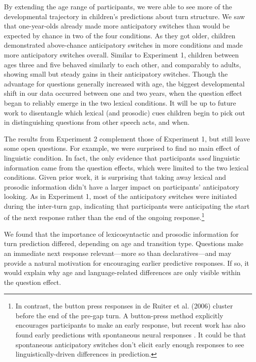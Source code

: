 \documentclass[authoryear, 12pt]{elsarticle}
\begin{document}
By extending the age range of participants, we were able to see more of the developmental trajectory in children's predictions about turn structure. We saw that one-year-olds already made more anticipatory switches than would be expected by chance in two of the four conditions. As they got older, children demonstrated above-chance anticipatory switches in more conditions and made more anticipatory switches overall. Similar to Experiment 1, children between ages three and five behaved similarly to each other, and comparably to adults, showing small but steady gains in their anticipatory switches. Though the advantage for questions generally increased with age, the biggest developmental shift in our data occurred between one and two years, when the question effect began to reliably emerge in the two lexical conditions. It will be up to future work to disentangle which lexical (and prosodic) cues children begin to pick out in distinguishing questions from other speech acts, and when.

The results from Experiment 2 complement those of Experiment 1, but still leave some open questions. For example, we were surprised to find no main effect of linguistic condition. In fact, the only evidence that participants \textit{used} linguistic information came from the question effects, which were limited to the two lexical conditions. Given prior work, it is surprising that taking away lexical and prosodic information didn't have a larger impact on participants' anticipatory looking. As in Experiment 1, most of the anticipatory switches were initiated during the inter-turn gap, indicating that participants were anticipating the start of the next response rather than the end of the ongoing response.\footnote{In contrast, the button press responses in de Ruiter et al. (2006) cluster before the end of the pre-gap turn. A button-press method explicitly encourages participants to make an early response, but recent work has also found early predictions with spontaneous neural responses \citep{bogelsmagyariInPrep, gisladottirUndRev, magyariUndRev}. It could be that spontaneous anticipatory switches don't elicit early enough responses to see linguistically-driven differences in prediction.} 

We found that the importance of lexicosyntactic and prosodic information for turn prediction differed, depending on age and transition type. Questions make an immediate next response relevant---more so than declaratives---and may provide a natural motivation for encouraging earlier predictive responses. If so, it would explain why age and language-related differences are only visible within the question effect. 
\end{document}

